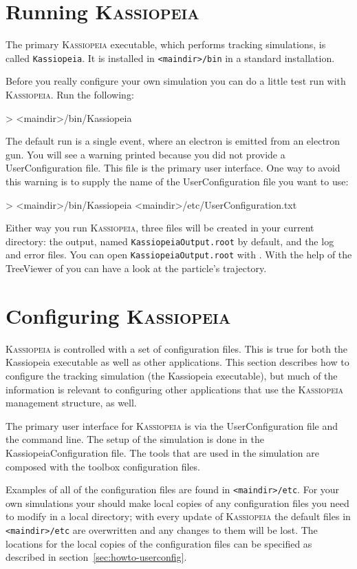 \section{Running \textsc{Kassiopeia}}
The primary \textsc{Kassiopeia} executable, which performs tracking simulations, is called \texttt{Kassiopeia}.  It is installed in \texttt{<maindir>/bin} in a standard installation.

Before you really configure your own simulation you can do a little test run with \textsc{Kassiopeia}. Run the following:
\begin{DoxyCode}
>  <maindir>/bin/Kassiopeia
\end{DoxyCode}
The default run is a single event, where an electron is emitted from an electron gun.  You will see a warning printed because you did not provide a UserConfiguration file.  This file is the primary user interface.  One way to avoid this warning is to supply the name of the UserConfiguration file you want to use:
\begin{DoxyCode}
>  <maindir>/bin/Kassiopeia <maindir>/etc/UserConfiguration.txt
\end{DoxyCode}
Either way you run \textsc{Kassiopeia}, three files will be created in your current directory: the output, named \texttt{KassiopeiaOutput.root} by default, and the log and error files.  
You can open \texttt{KassiopeiaOutput.root} with \cernroot. With the help of the TreeViewer of \cernroot{} you can have a look at the particle's trajectory.


\section{Configuring \textsc{Kassiopeia}}
\textsc{Kassiopeia} is controlled with a set of configuration files.  This is true for both the Kassiopeia executable as well as other applications.  This section describes how to configure the tracking simulation (the Kassiopeia executable), but much of the information is relevant to configuring other applications that use the \textsc{Kassiopeia} management structure, as well.

The primary user interface for \textsc{Kassiopeia} is via the UserConfiguration file and the command line.  The setup of the simulation is done in the KassiopeiaConfiguration file.  The tools that are used in the simulation are composed with the toolbox configuration files.

Examples of all of the configuration files are found in \texttt{<maindir>/etc}.  For your own simulations your should make local copies of any configuration files you need to modify in a local directory; with every update of \textsc{Kassiopeia} the default files in \texttt{<maindir>/etc} are overwritten and any changes to them will be lost.  The locations for the local copies of the configuration files can be specified as described in section~\ref{sec:howto-userconfig}.

